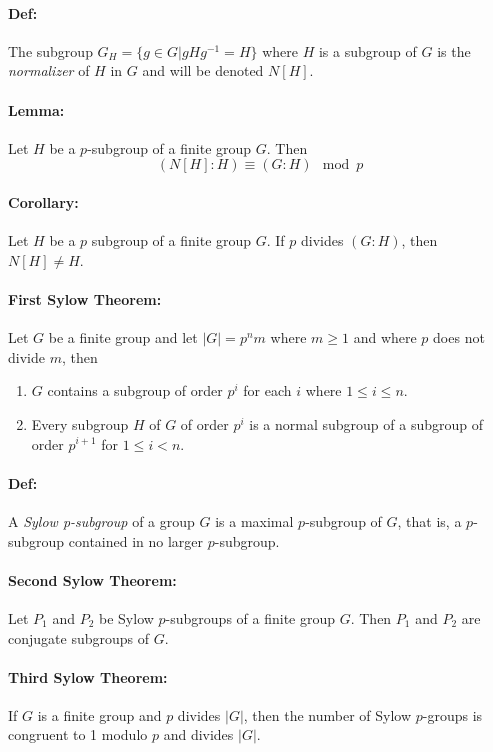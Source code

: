 \documentclass[10pt,a4paper]{article}
\begin{document}
\paragraph{Def:} The subgroup $G_H = \{ g \in G | gHg^{-1} = H \}$  where $H$ is a subgroup of $G$ is the \textit{normalizer} of $H$ in $G$ and will be denoted $N[H]$.

\paragraph{Lemma:} Let $H$ be a $p$-subgroup of a finite group $G$. Then
$$ (N[H]:H) \equiv (G:H)\mod p$$

\paragraph{Corollary:} Let $H$ be a $p$ subgroup of a finite group $G$. If $p$ divides $(G:H)$, then $N[H] \neq H$.

\paragraph{First Sylow Theorem:} Let $G$ be a finite group and let $|G| = p^nm$ where $m \geq 1$ and where $p$ does not divide $m$, then
\begin{enumerate}
\item $G$ contains a subgroup of order $p^i$ for each $i$ where $1 \leq i \leq n$.
\item Every subgroup $H$ of $G$ of order $p^i$ is a normal subgroup of a subgroup of order $p^{i+1}$ for $1 \leq i < n$.
\end{enumerate}

\paragraph{Def:} A \textit{Sylow p-subgroup} of a group $G$ is a maximal $p$-subgroup of $G$, that is,  a $p$-subgroup contained in no larger $p$-subgroup.

\paragraph{Second Sylow Theorem:} Let $P_1$ and $P_2$ be Sylow $p$-subgroups of a finite group $G$. Then $P_1$ and $P_2$ are conjugate subgroups of $G$.

\paragraph{Third Sylow Theorem:} If $G$ is a finite group and $p$ divides $|G|$, then the number of Sylow $p$-groups is congruent to 1 modulo $p$ and divides $|G|$.
\end{document}

